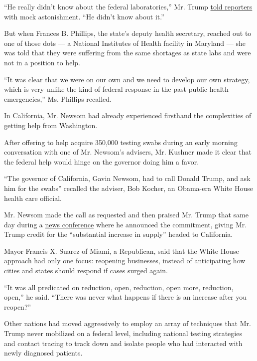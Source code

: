 ``He really didn't know about the federal laboratories,'' Mr. Trump
\href{https://www.whitehouse.gov/briefings-statements/remarks-president-trump-vice-president-pence-members-coronavirus-task-force-press-briefing-29/}{told
reporters} with mock astonishment. ``He didn't know about it.''

But when Frances B. Phillips, the state's deputy health secretary,
reached out to one of those dots --- a National Institutes of Health
facility in Maryland --- she was told that they were suffering from the
same shortages as state labs and were not in a position to help.

``It was clear that we were on our own and we need to develop our own
strategy, which is very unlike the kind of federal response in the past
public health emergencies,'' Ms. Phillips recalled.

In California, Mr. Newsom had already experienced firsthand the
complexities of getting help from Washington.

After offering to help acquire 350,000 testing swabs during an early
morning conversation with one of Mr. Newsom's advisers, Mr. Kushner made
it clear that the federal help would hinge on the governor doing him a
favor.

``The governor of California, Gavin Newsom, had to call Donald Trump,
and ask him for the swabs'' recalled the adviser, Bob Kocher, an
Obama-era White House health care official.

Mr. Newsom made the call as requested and then praised Mr. Trump that
same day during a
\href{https://www.facebook.com/CAgovernor/videos/686605895491026/}{news
conference} where he announced the commitment, giving Mr. Trump credit
for the ``substantial increase in supply'' headed to California.

Mayor Francis X. Suarez of Miami, a Republican, said that the White
House approach had only one focus: reopening businesses, instead of
anticipating how cities and states should respond if cases surged again.

``It was all predicated on reduction, open, reduction, open more,
reduction, open,'' he said. ``There was never what happens if there is
an increase after you reopen?''

Other nations had moved aggressively to employ an array of techniques
that Mr. Trump never mobilized on a federal level, including national
testing strategies and contact tracing to track down and isolate people
who had interacted with newly diagnosed patients.

